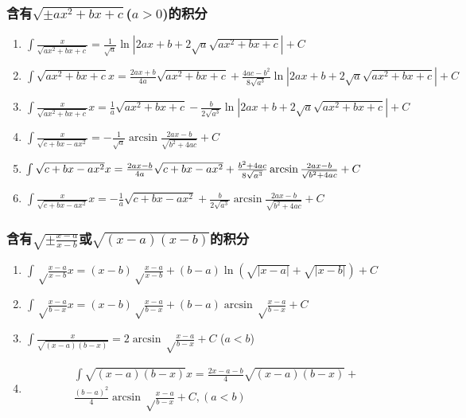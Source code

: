 \documentclass{book}
\begin{document}
\subsubsection{含有$\sqrt{\pm ax^2+bx+c}$($a>0$)的积分}

\begin{enumerate}

\item $ \int \frac{ x}{\sqrt{ax^2+bx+c}} = \frac{1}{\sqrt{a}} \ln | 2ax+b+2\sqrt{a}\sqrt{ax^2+bx+c} | + C $

\item $ \int \sqrt{ax^2+bx+c}  x = \frac{2ax+b}{4a}\sqrt{ax^2+bx+c} +
	\frac{4ac-b^2}{8\sqrt{a^3}}\ln |2ax+b+2\sqrt{a}\sqrt{ax^2+bx+c}| + C $

\item $ \int \frac{x}{\sqrt{ax^2+bx+c}}  x = \frac{1}{a}\sqrt{ax^2+bx+c} -
	\frac{b}{2\sqrt{a^3}}\ln | 2ax+b+2\sqrt{a}\sqrt{ax^2+bx+c} | + C $

\item $ \int \frac{ x}{\sqrt{c+bx-ax^2}} = -\frac{1}{\sqrt{a}} \arcsin \frac{2ax-b}{\sqrt{b^2+4ac}} + C  $

\item $ \int \sqrt{c+bx-ax^2}  x = \frac{2ax-b}{4a}\sqrt{c+bx-ax^2} + \\
	\frac{b^2+4ac}{8\sqrt{a^3}}\arcsin\frac{2ax-b}{\sqrt{b^2+4ac}} + C $

\item $ \int \frac{x}{\sqrt{c+bx-ax^2}}  x = -\frac{1}{a}\sqrt{c+bx-ax^2} + \frac{b}{2\sqrt{a^3}}\arcsin\frac{2ax-b}{\sqrt{b^2+4ac}} + C $

\end{enumerate}

\subsubsection{含有$\sqrt{\pm\frac{x-a}{x-b}}$或$\sqrt{(x-a)(x-b)}$的积分}

\begin{enumerate}

\item $ \int \sqrt\frac{x-a}{x-b}  x = (x-b)\sqrt\frac{x-a}{x-b} + (b-a)\ln(\sqrt{|x-a|}+\sqrt{|x-b|}) + C $

\item $ \int \sqrt\frac{x-a}{b-x}  x = (x-b)\sqrt\frac{x-a}{b-x} + (b-a)\arcsin\sqrt\frac{x-a}{b-x} + C $

\item $ \int \frac{ x}{\sqrt{(x-a)(b-x)}} = 2\arcsin\sqrt\frac{x-a}{b-x} + C$ ($a<b$)

\item \begin{multline}
\int \sqrt{(x-a)(b-x)}  x = \frac{2x-a-b}{4}\sqrt{(x-a)(b-x)} + \\
	\frac{(b-a)^2}{4}\arcsin\sqrt\frac{x-a}{b-x} + C, (a<b)
\end{multline}

\end{enumerate}
\end{document}
